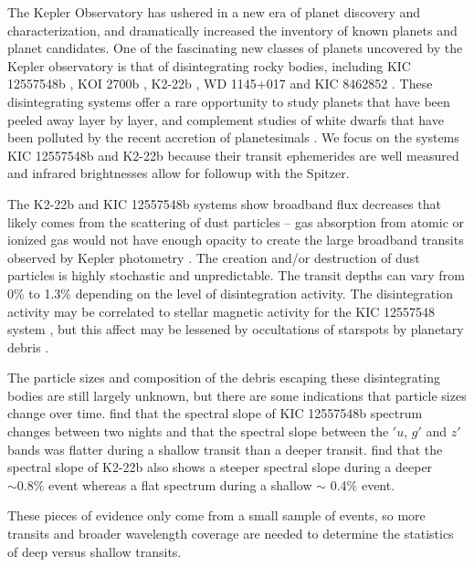 \documentclass[letterpaper,12pt]{article}
\begin{document}
The Kepler Observatory has ushered in a new era of planet discovery and characterization, and dramatically increased the inventory of known planets and planet candidates.
One of the fascinating new classes of planets uncovered by the Kepler observatory is that of disintegrating rocky bodies,
including KIC 12557548b \citep{rappaport}, KOI 2700b \citep{rappaport2014KOI2700}, K2-22b \citep{sanchis-ojedak2-22}, WD 1145+017 \citep{vanderburg2015wdDisintegrating} and KIC 8462852 \citep{boyajian846}.
These disintegrating systems offer a rare opportunity to study planets that have been peeled away layer by layer, and complement studies of white dwarfs that have been polluted by the recent accretion of planetesimals \cite[e.g.][]{jura2003wdPollution}.
We focus on the systems KIC 12557548b and K2-22b because their transit ephemerides are well measured and infrared brightnesses allow for followup with the Spitzer.

The K2-22b and KIC 12557548b systems show broadband flux decreases that likely comes from the scattering of dust particles -- gas absorption from atomic or ionized gas would not have enough opacity to create the large broadband transits observed by Kepler photometry \citep[0.423 $\mu$m to 0.897 $\mu$m bandpass;][]{koch2010keplerChar}.
The creation and/or destruction of dust particles is highly stochastic and unpredictable.
The transit depths can vary from 0\% to 1.3\% depending on the level of disintegration activity.
The disintegration activity may be correlated to stellar magnetic activity for the KIC 12557548 system \citep{kawahara2013starspots}, but this affect may be lessened by occultations of starspots by planetary debris \citep{croll2015starspots}.

The particle sizes and composition of the debris escaping these disintegrating bodies are still largely unknown, but there are some indications that particle sizes change over time.
\citet{bochinski2015evolving} find that the spectral slope of KIC 12557548b spectrum changes between two nights and that the spectral slope between the $'u$, $g'$ and $z'$ bands was flatter during a shallow transit than a deeper transit. 
\cite{sanchis-ojedak2-22} find that the spectral slope of K2-22b also shows a steeper spectral slope during a deeper $\sim 0.8\%$ event whereas a flat spectrum during a shallow $\sim$ 0.4\% event.

These pieces of evidence only come from a small sample of events, so more transits and broader wavelength coverage are needed to determine the statistics of deep versus shallow transits.
\end{document}

